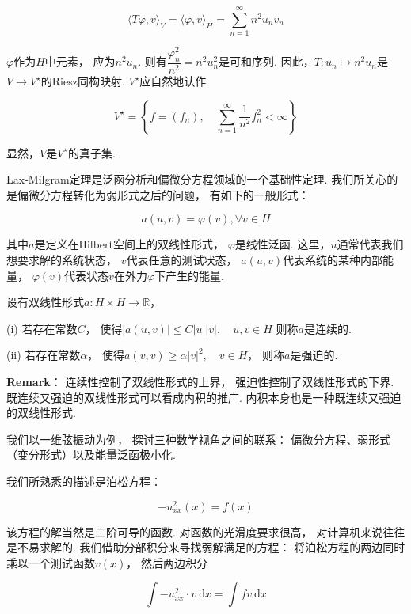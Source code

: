 \[
\langle T\varphi , v \rangle_{V} = 
\langle \varphi , v \rangle_{H} = 
 \sum_{n=1}^\infty n^2 u_n v_n
\]

$\varphi$作为$H$中元素，
应为$n^2 u_n$.
则有$\dfrac{\varphi_n^2}{n^2} = n^2 u_n^2$是可和序列.
因此，$T: u_n \mapsto n^2 u_n$是$V \to V^\star$的Riesz同构映射.
$V^\star$应自然地认作

\[
V^\star = 
\left\{ f = (f_n) , \quad \sum_{n=1}^{\infty} \frac{1}{n^2} f_n^2 < \infty \right\}
\]


显然，$V$是$V^\star$的真子集.


Lax-Milgram定理是泛函分析和偏微分方程领域的一个基础性定理.
我们所关心的是偏微分方程转化为弱形式之后的问题，
有如下的一般形式：

\[
a(u,v) = \varphi (v) , \forall v \in H
\]

其中$a$是定义在Hilbert空间上的双线性形式，
$\varphi$是线性泛函.
这里，$u$通常代表我们想要求解的系统状态，
$v$代表任意的测试状态，
$a(u,v)$代表系统的某种内部能量，
$\varphi (v)$代表状态$v$在外力$\varphi$下产生的能量.


\begin{definition}
    设有双线性形式$a : H \times H \to \mathbb{R}$，

    (i) 若存在常数$C$，
    使得$|a (u,v) | \le C |u||v|, \quad u , v \in H$
    则称$a$是连续的.

    (ii) 若存在常数$\alpha$，
    使得$a(v,v) \ge \alpha |v|^2, \quad v \in H$，
    则称$a$是强迫的. 
\end{definition}

\begin{remarkbox}
    \textbf{Remark}：
    连续性控制了双线性形式的上界，
    强迫性控制了双线性形式的下界.
    既连续又强迫的双线性形式可以看成内积的推广.
    内积本身也是一种既连续又强迫的双线性形式.
\end{remarkbox}

\medskip

我们以一维弦振动为例，
探讨三种数学视角之间的联系：
偏微分方程、弱形式（变分形式）以及能量泛函极小化.

我们所熟悉的描述是泊松方程：

\[
-u^2_{xx}(x) = f(x)
\]

该方程的解当然是二阶可导的函数.
对函数的光滑度要求很高，
对计算机来说往往是不易求解的.
我们借助分部积分来寻找弱解满足的方程：
将泊松方程的两边同时乘以一个测试函数$v(x)$，
然后两边积分

\[
\int -u^2_{xx} \cdot v ~ \mathrm{d}x 
= \int fv~ \mathrm{d} x
\]

